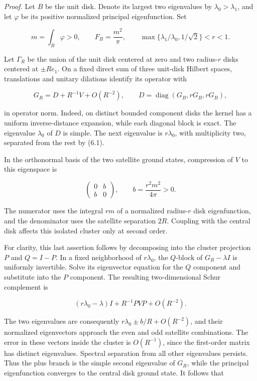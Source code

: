 \documentclass[11pt]{article}
\begin{document}
\emph{Proof.} Let \(B\) be the unit disk. Denote its largest two
eigenvalues by \(\lambda_0>\lambda_1\), and let \(\varphi\) be its
positive normalized principal eigenfunction. Set

\[
m=\int_B\varphi>0,\qquad F_B=\frac{m^2}\pi,
\qquad \max\{\lambda_1/\lambda_0,1/\sqrt2\}<r<1.
\tag{6.1}
\]

Let \(\Gamma_R\) be the union of the unit disk centered at zero and two
radius-\(r\) disks centered at \(\pm Re_1\). On a fixed direct sum of
three unit-disk Hilbert spaces, translations and unitary dilations
identify its operator with

\[
G_R=D+R^{-1}V+O(R^{-2}),
\qquad D=\operatorname{diag}(G_B,rG_B,rG_B),
\tag{6.2}
\]

in operator norm. Indeed, on distinct bounded component disks the kernel
has a uniform inverse-distance expansion, while each diagonal block is
exact. The eigenvalue \(\lambda_0\) of \(D\) is simple. The next
eigenvalue is \(r\lambda_0\), with multiplicity two, separated from the
rest by (6.1).

In the orthonormal basis of the two satellite ground states, compression
of \(V\) to this eigenspace is

\[
\begin{pmatrix}0&b\\b&0\end{pmatrix},
\qquad b=\frac{r^2m^2}{4\pi}>0.
\tag{6.3}
\]

The numerator uses the integral \(rm\) of a normalized radius-\(r\) disk
eigenfunction, and the denominator uses the satellite separation \(2R\).
Coupling with the central disk affects this isolated cluster only at
second order.

For clarity, this last assertion follows by decomposing into the cluster
projection \(P\) and \(Q=I-P\). In a fixed neighborhood of
\(r\lambda_0\), the \(Q\)-block of \(G_R-\lambda I\) is uniformly
invertible. Solve its eigenvector equation for the \(Q\) component and
substitute into the \(P\) component. The resulting two-dimensional Schur
complement is

\[
(r\lambda_0-\lambda)I+R^{-1}PVP+O(R^{-2}).
\tag{6.4}
\]

The two eigenvalues are consequently \(r\lambda_0\pm b/R+O(R^{-2})\),
and their normalized eigenvectors approach the even and odd satellite
combinations. The error in these vectors inside the cluster is
\(O(R^{-1})\), since the first-order matrix has distinct eigenvalues.
Spectral separation from all other eigenvalues persists. Thus the plus
branch is the simple second eigenvalue of \(G_R\), while the principal
eigenfunction converges to the central disk ground state. It follows
that
\end{document}
